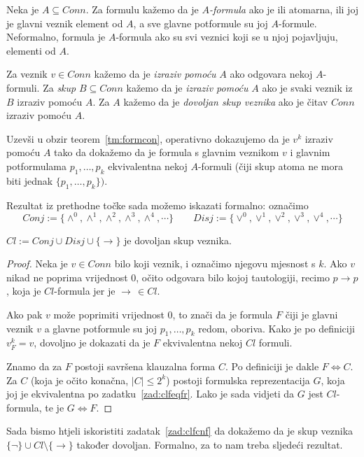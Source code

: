 \begin{definicija}
Neka je $A\subseteq Conn$. Za formulu kažemo da je $A$\emph{-formula} ako je ili atomarna, ili joj je glavni veznik element od $A$, a sve glavne potformule su joj $A$-formule. Neformalno, formula je $A$-formula ako su svi veznici koji se u njoj pojavljuju, elementi od $A$.
	
Za veznik $v\in Conn$ kažemo da je \emph{izraziv pomoću} $A$ ako odgovara nekoj $A$-formuli. Za \emph{skup} $B\subseteq Conn$ kažemo da je \emph{izraziv pomoću} $A$ ako je svaki veznik iz $B$ izraziv pomoću $A$. Za $A$ kažemo da je \emph{dovoljan skup veznika} ako je čitav $Conn$ izraziv pomoću $A$.
\end{definicija}

Uzevši u obzir teorem~\ref{tm:formcon}, operativno dokazujemo da je $v^k$ izraziv pomoću $A$ tako da dokažemo da je formula s glavnim veznikom $v$ i glavnim potformulama $p_1, \ldots, p_k$ ekvivalentna nekoj $A$-formuli (čiji skup atoma ne mora biti jednak $\{p_1,\ldots,p_k\})$.

Rezultat iz prethodne točke sada možemo iskazati formalno: označimo
$$Conj:=\{\wedge^0, \wedge^1, \wedge^2, \wedge^3,\wedge^4,\cdots\}\qquad Disj:=\{\vee^0, \vee^1, \vee^2,\vee^3,\vee^4,\cdots\}$$

\begin{teorem}
$Cl:=Conj\cup Disj\cup\{\to\}$ je
dovoljan skup veznika.
\end{teorem}

\begin{proof}
Neka je $v\in Conn$ bilo koji veznik, i označimo njegovu mjesnost s $k$. Ako $v$ nikad ne poprima vrijednost $0$, očito odgovara bilo kojoj tautologiji, recimo $p\to p$, koja je $Cl$-formula jer je $\to\,\in Cl$.

Ako pak $v$ može poprimiti vrijednost $0$, to znači da je formula $F$ čiji je glavni veznik $v$ a glavne potformule su joj $p_1,\ldots,p_k$ redom, oboriva. Kako je po definiciji $v^k_F=v$, dovoljno je dokazati da je $F$ ekvivalentna nekoj $Cl$ formuli.

Znamo da za $F$ postoji savršena klauzalna forma $C$. Po definiciji je dakle $F\Leftrightarrow C$. Za $C$ (koja je očito konačna, $\left|C\right|\le 2^k$) postoji formulska reprezentacija $G$, koja joj je ekvivalentna po zadatku~\ref{zad:clfeqfr}. Lako je sada vidjeti da $G$ jest $Cl$-formula, te je $G\Leftrightarrow F$.
\end{proof}

Sada bismo htjeli iskoristiti zadatak~\ref{zad:clfcnf} da dokažemo da je skup veznika $\{\neg\}\cup Cl\setminus\{\to\}$ također dovoljan. Formalno, za to nam treba sljedeći rezultat.

